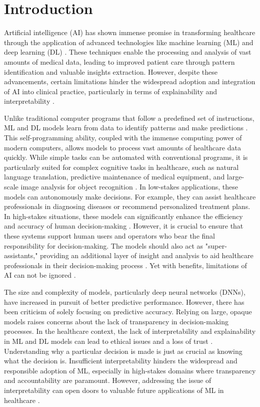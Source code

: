 \documentclass{article}
\begin{document}
\section{Introduction}
Artificial intelligence (AI) has shown immense promise in transforming healthcare through the application of advanced technologies like machine learning (ML) and deep learning (DL) \cite{bini2018artificial, dimiduk2018perspectives}. These techniques enable the processing and analysis of vast amounts of medical data, leading to improved patient care through pattern identification and valuable insights extraction. However, despite these advancements, certain limitations hinder the widespread adoption and integration of AI into clinical practice, particularly in terms of explainability and interpretability \cite{belle2021principles, DBLP:journals/corr/abs-1807-06722}.

Unlike traditional computer programs that follow a predefined set of instructions, ML and DL models learn from data to identify patterns and make predictions \cite{kocher2021machine}. This self-programming ability, coupled with the immense computing power of modern computers, allows models to process vast amounts of healthcare data quickly. While simple tasks can be automated with conventional programs, it is particularly suited for complex cognitive tasks in healthcare, such as natural language translation, predictive maintenance of medical equipment, and large-scale image analysis for object recognition \cite{collins2019reporting}. In low-stakes applications, these models can autonomously make decisions. For example, they can assist healthcare professionals in diagnosing diseases or recommend personalized treatment plans. In high-stakes situations, these models can significantly enhance the efficiency and accuracy of human decision-making \cite{lee2021application}. However, it is crucial to ensure that these systems support human users and operators who bear the final responsibility for decision-making. The models should also act as "super-assistants," providing an additional layer of insight and analysis to aid healthcare professionals in their decision-making process \cite{nauta2023explainable}. Yet with benefits, limitations of AI can not be ignored \cite{burger2023hybrid}.

The size and complexity of models, particularly deep neural networks (DNNs), have increased in pursuit of better predictive performance. However, there has been criticism of solely focusing on predictive accuracy. Relying on large, opaque models raises concerns about the lack of transparency in decision-making processes. In the healthcare context, the lack of interpretability \cite{zhang2021survey} and explainability \cite{rosenfeld2019explainability} in ML and DL models can lead to ethical issues and a loss of trust \cite{ferrara2023fairness, holzinger2019causability}. Understanding why a particular decision is made is just as crucial as knowing what the decision is. Insufficient interpretability hinders the widespread and responsible adoption of ML, especially in high-stakes domains where transparency and accountability are paramount. However, addressing the issue of interpretability can open doors to valuable future applications of ML in healthcare \cite{ghassemi2021false}.
\end{document}
